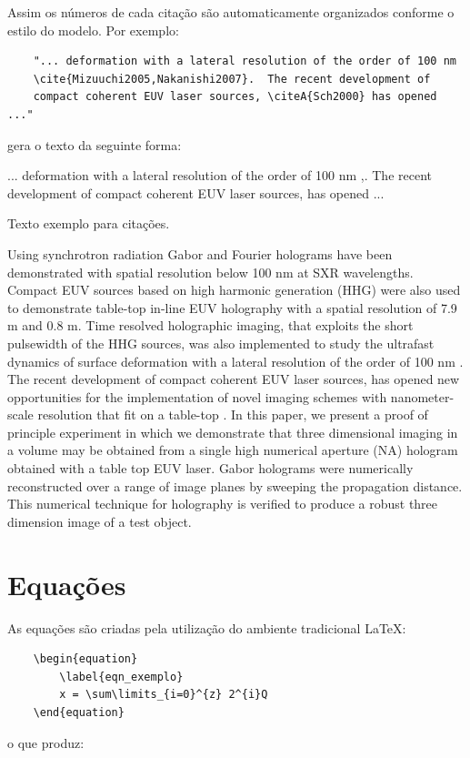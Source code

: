 \documentclass[12pt,A4,A4pt]{article}
\begin{document}
Assim os números de cada citação são automaticamente organizados conforme o estilo do modelo. Por exemplo:

\begin{verbatim}
    "... deformation with a lateral resolution of the order of 100 nm
    \cite{Mizuuchi2005,Nakanishi2007}.  The recent development of 
    compact coherent EUV laser sources, \citeA{Sch2000} has opened ..."
\end{verbatim}
gera o texto da seguinte forma:

... deformation with a lateral resolution of the order of 100 nm \cite{Nakanishi2007},\break \cite{Mizuuchi2002}. The recent development of compact coherent EUV laser sources,  has opened ...

Texto exemplo para citações.

Using synchrotron radiation Gabor and Fourier holograms have been demonstrated \cite{Mizuuchi2003}
 with spatial resolution below 100 nm at SXR wavelengths.  Compact EUV sources based on high harmonic generation (HHG) were also used to demonstrate table-top in-line EUV holography with a spatial resolution of 7.9 m  and 0.8 m.  Time resolved holographic imaging, that exploits the short pulsewidth of the HHG sources, was also implemented to study the ultrafast dynamics of surface deformation with a lateral resolution of the order of 100 nm \cite{Mizuuchi2005,Nakanishi2007}.  The recent development of compact coherent EUV laser sources,  has opened new opportunities for the implementation of novel imaging schemes with nanometer-scale resolution that fit on a table-top \cite{Mizuuchi2003,scht2000}. In this paper, we present a proof of principle experiment in which we demonstrate that three dimensional imaging in a volume may be obtained from a single high numerical  aperture (NA) hologram obtained with a table top EUV laser. Gabor holograms were numerically reconstructed over a range of image planes by sweeping the propagation distance. This numerical  technique for holography is verified to produce a robust three dimension image of a test object.  

\section{Equações}
As equações são criadas pela utilização do ambiente tradicional \LaTeX:

\begin{verbatim}
    \begin{equation}
        \label{eqn_exemplo}
        x = \sum\limits_{i=0}^{z} 2^{i}Q
    \end{equation}
\end{verbatim}
o que produz:
\end{document}
